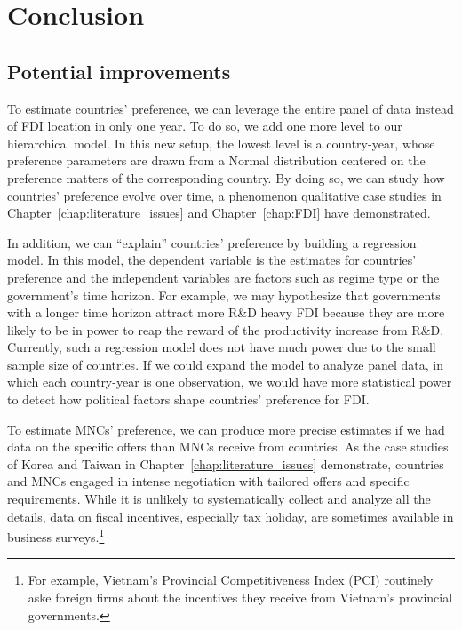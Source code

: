 \chapter{Conclusion}
\label{chap:conclusion}

\section{Potential improvements}

To estimate countries' preference, we can leverage the entire panel of data
instead of FDI location in only one year. To do so, we add one more level to our
hierarchical model. In this new setup, the lowest level is a country-year, whose
preference parameters are drawn from a Normal distribution centered on the
preference matters of the corresponding country. By doing so, we can study how
countries' preference evolve over time, a phenomenon qualitative case studies in
Chapter~\ref{chap:literature_issues} and Chapter~\ref{chap:FDI} have
demonstrated.

In addition, we can ``explain'' countries' preference by building a regression
model. In this model, the dependent variable is the estimates for countries'
preference and the independent variables are factors such as regime type or the
government's time horizon. For example, we may hypothesize that governments with
a longer time horizon attract more R\&D heavy FDI because they are more likely
to be in power to reap the reward of the productivity increase from R\&D.
Currently, such a regression model does not have much power due to the small
sample size of countries. If we could expand the model to analyze panel data, in
which each country-year is one observation, we would have more statistical power
to detect how political factors shape countries' preference for FDI.

To estimate MNCs' preference, we can produce more precise estimates if
we had data on the specific offers than MNCs receive from countries. As the case
studies of Korea and Taiwan in Chapter~\ref{chap:literature_issues} demonstrate,
countries and MNCs engaged in intense negotiation with tailored offers and
specific requirements. While it is unlikely to systematically collect and
analyze all the details, data on fiscal incentives, especially tax holiday, are
sometimes available in business surveys.\footnote{For example, Vietnam's
  Provincial Competitiveness Index (PCI) routinely aske foreign firms about the
  incentives they receive from Vietnam's provincial governments.}

